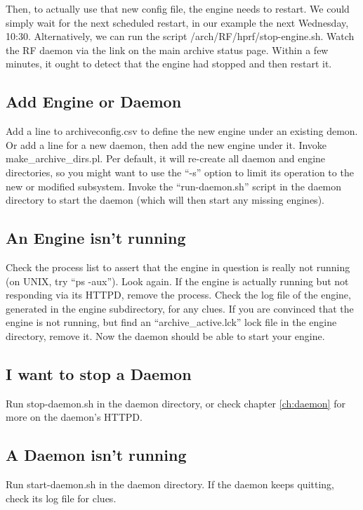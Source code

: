 Then, to actually use that new config file, the engine needs to
restart. We could simply wait for the next scheduled restart, in our
example the next Wednesday, 10:30. Alternatively, we can run the
script /arch/RF/hprf/stop-engine.sh.
Watch the RF daemon via the link on the main archive status page.
Within a few minutes, it ought to detect that the engine had stopped
and then restart it.

\subsection{Add Engine or Daemon}
Add a line to archiveconfig.csv to define the new engine under an
existing demon. Or add a line for a new daemon, then add the new
engine under it. Invoke  make\_archive\_dirs.pl. Per default, it will
re-create all daemon and engine directories, so you might want to use
the ``-s'' option to limit its operation to the new or modified
subsystem.
Invoke the ``run-daemon.sh'' script in the daemon directory to start
the daemon (which will then start any missing engines).

\subsection{An Engine isn't running}
Check the process list to assert that the engine in question is really not
running (on UNIX, try ``ps -aux''). Look again. If the engine is
actually running but not responding via its HTTPD, remove the process.
Check the log file of the engine, generated in the engine
subdirectory, for any clues. If you are convinced that the engine is
not running, but find an ``archive\_active.lck'' lock file in the
engine directory, remove it. Now the daemon should be able to start
your engine.  

\subsection{I want to stop a Daemon}
Run stop-daemon.sh in the daemon directory, or check chapter
\ref{ch:daemon} for more on the daemon's HTTPD.

\subsection{A Daemon isn't running}
Run start-daemon.sh in the daemon directory. If the daemon keeps quitting,
check its log file for clues.

